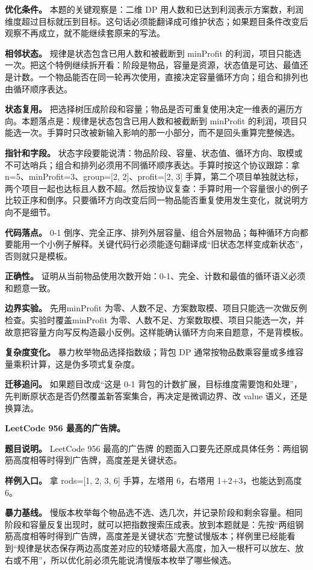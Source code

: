 \textbf{优化条件。} 本题的关键观察是：二维 DP 用人数和已达到利润表示方案数，利润维度超过目标就压到目标。这句话必须能翻译成可维护状态；如果题目条件改变后观察不再成立，就不能继续套原来的写法。

\textbf{相邻状态。} 规律是状态包含已用人数和被截断到 minProfit 的利润，项目只能选一次。把这个特例继续拆开看：阶段是物品，容量是资源，状态值是可达、最值还是计数。一个物品能否在同一轮再次使用，直接决定容量循环方向；组合和排列也由循环顺序表达。

\textbf{状态复用。} 把选择树压成阶段和容量；物品是否可重复使用决定一维表的遍历方向。本题落点是：规律是状态包含已用人数和被截断到 minProfit 的利润，项目只能选一次。手算时只改被新输入影响的那一小部分，而不是回头重算完整候选。

\textbf{指针和字段。} 状态字段要能说清：物品阶段、容量、状态值、循环方向、取模或不可达哨兵；组合和排列必须用不同循环顺序表达。手算时按这个协议跟踪：拿 n=5、minProfit=3、group=[2, 2]、profit=[2, 3] 手算，第二个项目单独就达标，两个项目一起也达标且人数不超。然后按协议复查：手算时用一个容量很小的例子比较正序和倒序。只要循环方向改变后同一物品能否重复使用发生变化，就说明方向不是细节。

\textbf{代码落点。} 0-1 倒序、完全正序、排列外层容量、组合外层物品；每种循环方向都要能用一个小例子解释。关键代码行必须能逐句翻译成“旧状态怎样变成新状态”，否则就只是模板。

\textbf{正确性。} 证明从当前物品使用次数开始：0-1、完全、计数和最值的循环语义必须和题意一致。

\textbf{边界实验。} 先用minProfit 为零、人数不足、方案数取模、项目只能选一次做反例检查。实验时覆盖minProfit 为零、人数不足、方案数取模、项目只能选一次，并故意把容量方向写反构造最小反例。这样能确认循环方向来自题意，不是背模板。

\textbf{复杂度变化。} 暴力枚举物品选择指数级；背包 DP 通常按物品数乘容量或多维容量乘积计算，这是伪多项式复杂度。

\textbf{迁移追问。} 如果题目改成“这是 0-1 背包的计数扩展，目标维度需要饱和处理”，先判断原状态是否仍然覆盖新答案集合，再决定是微调边界、改 value 语义，还是换算法。

\noindent\textbf{LeetCode 956 最高的广告牌。}

\textbf{题目说明。} LeetCode 956 最高的广告牌 的题面入口要先还原成具体任务：两组钢筋高度相等时得到广告牌，高度差是关键状态。

\textbf{样例入口。} 拿 rods=[1, 2, 3, 6] 手算，左塔用 6，右塔用 1+2+3，也能达到高度 6。

\textbf{暴力基线。} 慢版本枚举每个物品选不选、选几次，并记录阶段和剩余容量。相同阶段和容量反复出现时，就可以把指数搜索压成表。放到本题就是：先按“两组钢筋高度相等时得到广告牌，高度差是关键状态”完整试慢版本；样例里已经能看到“规律是状态保存两边高度差对应的较矮塔最大高度，加入一根杆可以放左、放右或不用”，所以优化前必须先能说清慢版本枚举了哪些候选。

